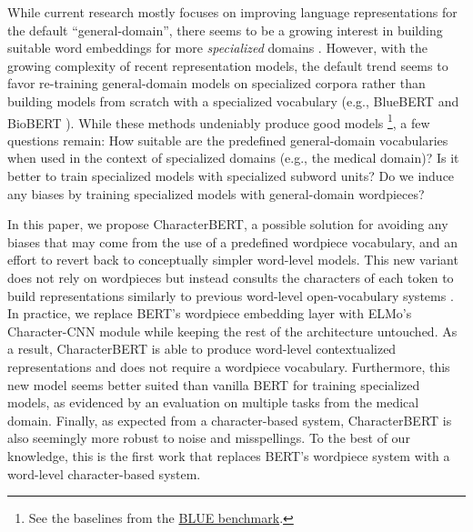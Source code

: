 \documentclass[11pt]{article}
\begin{document}
While current research mostly focuses on improving language representations for the default ``general-domain'', there seems to be a growing interest in building suitable word embeddings for more \textit{specialized} domains \cite{el-boukkouri-etal-2019-embedding,si2019enhancing,elwany2019bert}. However, with the growing complexity of recent representation models, the default trend seems to favor re-training general-domain models on specialized corpora rather than building models from scratch with a specialized vocabulary (e.g., BlueBERT \cite{peng2019transfer} and BioBERT \cite{lee2020biobert}). While these methods undeniably produce good models \footnote{See the baselines from the \href{https://github.com/ncbi-nlp/BLUE_Benchmark/\#baselines}{BLUE benchmark}.}, a few questions remain: How suitable are the predefined general-domain vocabularies when used in the context of specialized domains (e.g., the medical domain)? Is it better to train specialized models with specialized subword units? Do we induce any biases by training specialized models with general-domain wordpieces?

In this paper, we propose CharacterBERT, a possible solution for avoiding any biases that may come from the use of a predefined wordpiece vocabulary, and an effort to revert back to conceptually simpler word-level models. This new variant does not rely on wordpieces but instead consults the characters of each token to build representations similarly to previous word-level open-vocabulary systems \cite{luong-manning-2016-achieving,kim2016character,jozefowicz2016exploring}. In practice, we replace BERT's wordpiece embedding layer with ELMo's \cite{peters-etal-2018-deep} Character-CNN module while keeping the rest of the architecture untouched. As a result, CharacterBERT is able to produce word-level contextualized representations and does not require a wordpiece vocabulary. Furthermore, this new model seems better suited than vanilla BERT for training specialized models, as evidenced by an evaluation on multiple tasks from the medical domain. Finally, as expected from a character-based system, CharacterBERT is also seemingly more robust to noise and misspellings. To the best of our knowledge, this is the first work that replaces BERT's wordpiece system with a word-level character-based system. \\
\end{document}
